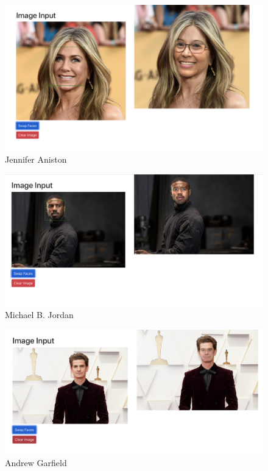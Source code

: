 \begin{figure}[t]
    \centering
    \includegraphics[width=\linewidth]{jennifer_aniston_result.png}
    \caption{Jennifer Aniston}
    \label{fig:result2}
\end{figure}

\begin{figure}[t]
    \centering
    \includegraphics[width=\linewidth]{michael_b_jordan_result.png}
    \caption{Michael B. Jordan}
    \label{fig:result3}
\end{figure}

\begin{figure}[t]
    \centering
    \includegraphics[width=\linewidth]{andrew_garfield_result.png}
    \caption{Andrew Garfield}
    \label{fig:result4}
\end{figure}

